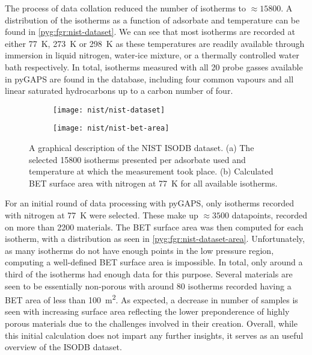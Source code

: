 The process of data collation reduced the number of isotherms
to \(\approx \! 15800\). A distribution of the isotherms as a 
function of adsorbate and temperature can be found 
in \autoref{pyg:fgr:nist-dataset}.
We can see that most isotherms are recorded at either 
\SI{77}{\kelvin}, \SI{273}{\kelvin} or \SI{298}{\kelvin} as 
these temperatures are readily available through immersion
in liquid nitrogen, water-ice mixture, or a thermally controlled
water bath respectively. In total, isotherms measured with all 20 
probe gasses available in pyGAPS are found in the database, 
including four common vapours and all linear saturated hydrocarbons
up to a carbon number of four. 

\begin{figure}[htb]
    \centering

    \begin{subfigure}[b]{0.5\linewidth}
        \texttt{[image: nist/nist-dataset]}%
        \caption{}%
        \label{pyg:fgr:nist-dataset}
    \end{subfigure}%
    \begin{subfigure}[b]{0.45\linewidth}
        \texttt{[image: nist/nist-bet-area]}%
        \caption{}%
        \label{pyg:fgr:nist-dataset-area}
    \end{subfigure}%

    \caption{A graphical description of the NIST ISODB dataset.
    (a) The selected 15800 isotherms presented per adsorbate used
    and temperature at which the measurement took place.
    (b) Calculated BET surface area with nitrogen at \SI{77}{\kelvin}
    for all available isotherms. }%
    \label{pyg:fgr:nist-set}
\end{figure}

For an initial round of data processing with pyGAPS,
only isotherms recorded with nitrogen at \SI{77}{\kelvin}
were selected. These make up \(\approx \! 3500\) datapoints,
recorded on more than 2200 materials. The BET surface area 
was then computed for each isotherm, with a distribution
as seen in \autoref{pyg:fgr:nist-dataset-area}.
Unfortunately, as many isotherms do not have enough points
in the low pressure region, computing a well-defined
BET surface area is impossible. In total, only around a
third of the isotherms had enough data for this purpose.
Several materials are seen to be essentially non-porous
with around 80 isotherms recorded having a BET area of less 
than \SI{100}{\metre^2}. As expected, a decrease in 
number of samples is seen with increasing surface area
reflecting the lower preponderence of highly porous 
materials due to the challenges involved in their 
creation. Overall, while this initial calculation does 
not impart any further insights, it serves as an useful overview
of the ISODB dataset.

